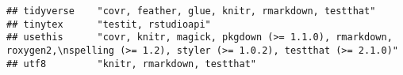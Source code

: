 \documentclass[]{book}
\begin{document}
\begin{verbatim}
## tidyverse    "covr, feather, glue, knitr, rmarkdown, testthat"                                                                                                                                                                                                                                                                                                                                                                                                                                                                                                                                                                                                                                                         
## tinytex      "testit, rstudioapi"                                                                                                                                                                                                                                                                                                                                                                                                                                                                                                                                                                                                                                                                                      
## usethis      "covr, knitr, magick, pkgdown (>= 1.1.0), rmarkdown, roxygen2,\nspelling (>= 1.2), styler (>= 1.0.2), testthat (>= 2.1.0)"                                                                                                                                                                                                                                                                                                                                                                                                                                                                                                                                                                                
## utf8         "knitr, rmarkdown, testthat"                                                                                                                                                                                                                                                                                                                                                                                                                                                                                                                                                                                                                                                                              

\end{verbatim}
\end{document}
